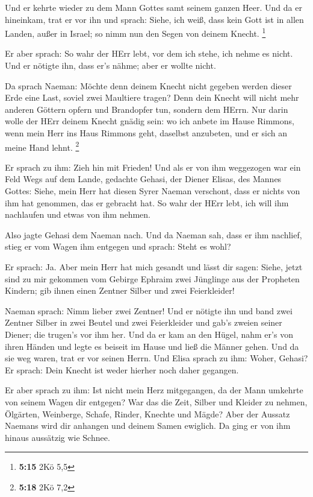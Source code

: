  Und er kehrte wieder zu dem Mann Gottes samt seinem
ganzen Heer. Und da er hineinkam, trat er vor ihn und sprach: Siehe, ich
weiß, dass kein Gott ist in allen Landen, außer in Israel; so nimm nun
den Segen von deinem Knecht. \footnote{\textbf{5:15} 2Kö 5,5}

 Er aber sprach: So wahr der HErr lebt, vor dem ich
stehe, ich nehme es nicht. Und er nötigte ihn, dass er's nähme; aber er
wollte nicht.

 Da sprach Naeman: Möchte denn deinem Knecht nicht
gegeben werden dieser Erde eine Last, soviel zwei Maultiere tragen? Denn
dein Knecht will nicht mehr anderen Göttern opfern und Brandopfer tun,
sondern dem HErrn.  Nur darin wolle der HErr deinem
Knecht gnädig sein: wo ich anbete im Hause Rimmons, wenn mein Herr ins
Haus Rimmons geht, daselbst anzubeten, und er sich an meine Hand lehnt.
\footnote{\textbf{5:18} 2Kö 7,2}

 Er sprach zu ihm: Zieh hin mit Frieden! Und als er von
ihm weggezogen war ein Feld Wegs auf dem Lande,  gedachte
Gehasi, der Diener Elisas, des Mannes Gottes: Siehe, mein Herr hat
diesen Syrer Naeman verschont, dass er nichts von ihm hat genommen, das
er gebracht hat. So wahr der HErr lebt, ich will ihm nachlaufen und
etwas von ihm nehmen.

 Also jagte Gehasi dem Naeman nach. Und da Naeman sah,
dass er ihm nachlief, stieg er vom Wagen ihm entgegen und sprach: Steht
es wohl?

 Er sprach: Ja. Aber mein Herr hat mich gesandt und lässt
dir sagen: Siehe, jetzt sind zu mir gekommen vom Gebirge Ephraim zwei
Jünglinge aus der Propheten Kindern; gib ihnen einen Zentner Silber und
zwei Feierkleider!

 Naeman sprach: Nimm lieber zwei Zentner! Und er nötigte
ihn und band zwei Zentner Silber in zwei Beutel und zwei Feierkleider
und gab's zweien seiner Diener; die trugen's vor ihm her.
 Und da er kam an den Hügel, nahm er's von ihren Händen
und legte es beiseit im Hause und ließ die Männer gehen. 
Und da sie weg waren, trat er vor seinen Herrn. Und Elisa sprach zu ihm:
Woher, Gehasi? Er sprach: Dein Knecht ist weder hierher noch daher
gegangen.

 Er aber sprach zu ihm: Ist nicht mein Herz mitgegangen,
da der Mann umkehrte von seinem Wagen dir entgegen? War das die Zeit,
Silber und Kleider zu nehmen, Ölgärten, Weinberge, Schafe, Rinder,
Knechte und Mägde?  Aber der Aussatz Naemans wird dir
anhangen und deinem Samen ewiglich. Da ging er von ihm hinaus aussätzig
wie Schnee.

